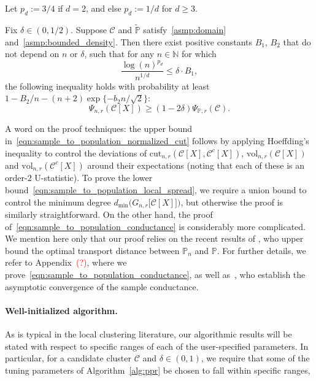 \documentclass[11pt,twoside]{article}
\newcommand{\1}{\mathbf{1}}
\newcommand{\mc}[1]{\mathcal{#1}}
\newcommand{\Pbb}{\mathbb{P}}
\newcommand{\wt}[1]{\widetilde{#1}}
\newcommand{\vol}{\mathrm{vol}}
\newcommand{\cut}{\mathrm{cut}}
\begin{document}
Let $p_d := 3/4$ if $d = 2$, and else $p_d := 1/d$ for $d \geq 3$. 
\begin{proposition}
	\label{prop:sample_to_population_2}
	Fix $\delta \in (0,1/2)$. Suppose $\mc{C}$ and $\wt{\Pbb}$ satisfy~\ref{asmp:domain} and~\ref{asmp:bounded_density}. Then there exist positive constants $B_1$, $B_2$ that do not depend on $n$ or $\delta$, such that for any $n \in \mathbb{N}$ for which
	\begin{equation}
	\label{eqn:sample_to_population_conductance_sample_complexity}
	\frac{\log(n)^{p_d}}{n^{1/d}} \leq \delta \cdot B_1,
	\end{equation}
	the following inequality holds with probability at least $1 - B_2/n - (n + 2)\exp\{-b_2n/\sqrt{2}\}$:
	\begin{equation}
	\label{eqn:sample_to_population_conductance}
	\Psi_{n,r}(\mc{C}[X]) \geq (1 - 2\delta) \Psi_{\Pbb,r}(\mc{C}).
	\end{equation}
\end{proposition}

A word on the proof techniques: the upper bound in~\eqref{eqn:sample_to_population_normalized_cut} follows by applying Hoeffding's inequality to control the deviations of $\cut_{n,r}(\mc{C}[X],\mc{C}^c[X])$, $\vol_{n,r}(\mc{C}[X])$ and $\vol_{n,r}(\mc{C}^c[X])$ around their expectations (noting that each of these is an order-$2$ U-statistic). To prove the lower bound~\eqref{eqn:sample_to_population_local_spread}, we require a union bound to control the minimum degree $d_{\min}\bigl(G_{n,r}\bigl[\mc{C}[X]\bigr]\bigr)$, but otherwise the proof is similarly straightforward. On the other hand, the proof of~\eqref{eqn:sample_to_population_conductance} is considerably more complicated. We mention here only that our proof relies on the recent results of \citep{garciatrillos16b}, who upper bound the optimal transport distance between $\mathbb{P}_n$ and $\mathbb{P}$. For further details, we refer to Appendix~\textcolor{red}{(?)}, where we prove~\eqref{eqn:sample_to_population_conductance}, as well as~\citep{garciatrillos16}, who establish the asymptotic convergence of the sample conductance.


\paragraph{Well-initialized algorithm.} As is typical in the local clustering literature, our algorithmic results will be stated with respect to specific ranges of each of the user-specified
parameters. In particular, for a candidate cluster $\mc{C}$ and $\delta \in (0,1)$, we require that some of the tuning parameters of Algorithm~\ref{alg:ppr} be chosen to fall within specific ranges, 
\end{document}
